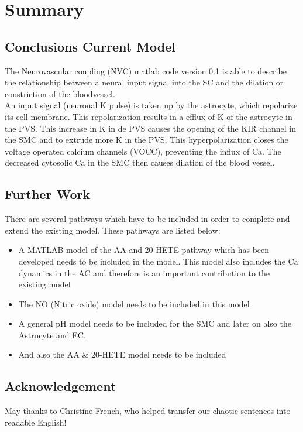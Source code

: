 \section{Summary}

\subsection{Conclusions Current Model}
The Neurovascular coupling (NVC) matlab code version 0.1 is able to describe the relationship between a neural input signal into the \gls{SC} and the dilation or constriction of the bloodvessel. \\

An input signal (neuronal \gls{K} pulse) is taken up by the astrocyte, which repolarize its cell membrane. This repolarization results in a efflux of \gls{K} of the astrocyte in the PVS. This increase in \gls{K} in de PVS causes the opening of the KIR channel in the SMC and to extrude more \gls{K} in the PVS. This hyperpolarization closes the voltage operated calcium channels (VOCC), preventing the influx of \gls{Ca}. The decreased cytosolic \gls{Ca} in the SMC then causes dilation of the blood vessel.\\




\subsection{Further Work} \label{sec:furtherwork}

There are several pathways which have to be included in order to complete and extend the existing model. These pathways are listed below:
\begin{itemize}
\item A MATLAB model of the AA and 20-HETE pathway which has been developed needs to be included in the model. This model also includes the \gls{Ca} dynamics in the AC and therefore is an important contribution to the existing model
\item The NO (Nitric oxide) model needs to be included in this model
\item A general pH model needs to be included for the SMC and later on also the Astrocyte and EC.
\item And also the AA \& 20-HETE model needs to be included
\end{itemize}


\subsection*{Acknowledgement}
May thanks to Christine French, who helped transfer our chaotic sentences into readable English! 

